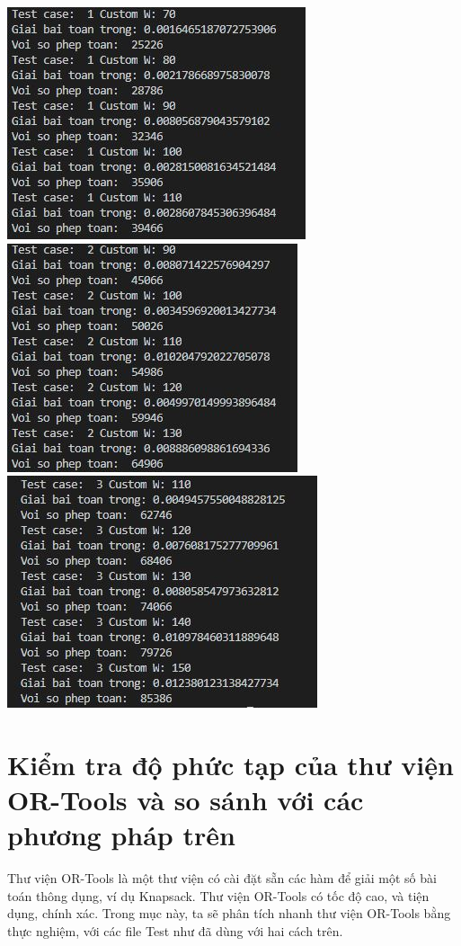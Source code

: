 \documentclass[12pt,a4paper]{report}
\begin{document}
    \begin{center}
        \includegraphics{DPT1.JPG}
        \includegraphics{DPT2.JPG}
        \includegraphics{DPT3.JPG}
    \end{center}
    \section{Kiểm tra độ phức tạp của thư viện OR-Tools và so sánh với các phương pháp trên}
    Thư viện OR-Tools là một thư viện có cài đặt sẵn các hàm để giải một số bài toán
    thông dụng, ví dụ Knapsack. Thư viện OR-Tools có tốc độ cao, và tiện dụng, chính xác. 
    Trong mục này, ta sẽ phân tích nhanh thư viện OR-Tools bằng thực nghiệm, với các
    file Test như đã dùng với hai cách trên.
    
\end{document}
